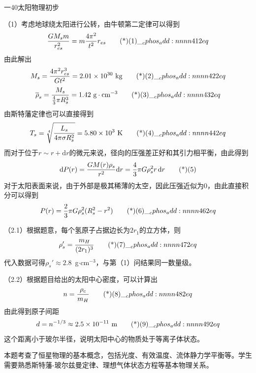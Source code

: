 \documentclass[answer]{cphos}
\begin{document}
\begin{problem}{一}{40}{太阳物理初步}
\begin{solution}

（1）考虑地球绕太阳进行公转，由牛顿第二定律可以得到
\begin{equation}
    \frac{GM_s m}{r_{es}^2} = m \frac{4\pi^2}{t^2} r_{es} \eqtagscore{1}{2}
\end{equation}
由此解出
\begin{equation}
    M_s = \frac{4\pi^2 r_{es}^3}{Gt^2} = 2.01 \times 10^{30} \text{ kg} \eqtagscore{2}{2}
\end{equation}
\begin{equation}
    \overline{\rho}_s = \frac{M_s}{\frac{4}{3}\pi R_s^3} = 1.42 \text{ g}\cdot\text{cm}^{-3} \eqtagscore{3}{2}
\end{equation}
由斯特藩定律也可以直接得到
\begin{equation}
    T_s = \sqrt[4]{\frac{L_s}{4\pi\sigma R_s^2}} = 5.80 \times 10^{3} \text{ K} \eqtagscore{4}{2}
\end{equation}
而对于位于$r\sim r+\mathrm{d}r$的微元来说，径向的压强差正好和其引力相平衡，由此得到
\begin{equation}
    \mathrm{d}P(r) = \frac{GM(r)\rho_s}{r^2}\mathrm{d}r = \frac{4}{3}\pi G\rho_s^2 r\,\mathrm{d}r \eqtag{5}
\end{equation}
对于太阳表面来说，由于外部是极其稀薄的太空，因此压强近似为0，由此直接积分可以得到
\begin{equation}
    P(r) = \frac{2}{3}\pi G\rho_s^2(R_s^2 - r^2) \eqtagscore{6}{2}
\end{equation}


（2.1）根据题意，每个氢原子占据边长为$2r_1$的立方体，则
\begin{equation}
    \rho_s' = \frac{m_H}{(2r_1)^3} \eqtagscore{7}{2}
\end{equation}
代入数据可得$\rho_s' \approx 2.8$~g$\cdot$cm$^{-3}$，与第（1）问结果同一数量级。


（2.2）根据题目给出的太阳中心密度，可以计算出
\begin{equation}
    n = \frac{\rho_c}{m_H} \eqtagscore{8}{2}
\end{equation}
由此得到原子间距
\begin{equation}
    d = n^{-1/3} \approx 2.5 \times 10^{-11} \text{ m} \eqtagscore{9}{2}
\end{equation}
这个距离小于玻尔半径，说明太阳中心的物质处于等离子体状态。


\end{solution}

\begin{problemappendix}
本题考查了恒星物理的基本概念，包括光度、有效温度、流体静力学平衡等。学生需要熟悉斯特藩-玻尔兹曼定律、理想气体状态方程等基本物理关系。
\end{problemappendix}

\end{problem}
\end{document}
